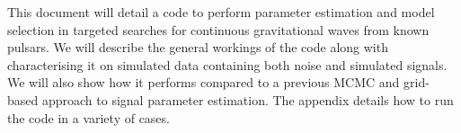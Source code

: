 This document will detail a code to perform parameter estimation and model selection in targeted
searches for continuous gravitational waves from known pulsars. We will describe the general
workings of the code along with characterising it on simulated data containing both noise and
simulated signals. We will also show how it performs compared to a previous MCMC and grid-based
approach to signal parameter estimation. The appendix details how to run the code in a variety of
cases.